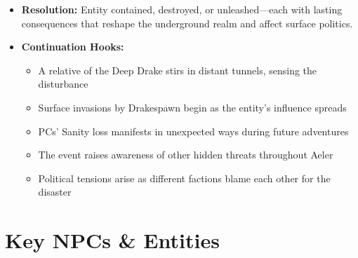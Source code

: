 \documentclass[11pt]{article}
\begin{document}
\begin{itemize}
\begin{itemize}
  \end{itemize}
\item \textbf{Resolution:} Entity contained, destroyed, or unleashed—each with lasting consequences that reshape the underground realm and affect surface politics.
\item \textbf{Continuation Hooks:}
  \begin{itemize}
  \item A relative of the Deep Drake stirs in distant tunnels, sensing the disturbance
  \item Surface invasions by Drakespawn begin as the entity's influence spreads
  \item PCs' Sanity loss manifests in unexpected ways during future adventures
  \item The event raises awareness of other hidden threats throughout Aeler
  \item Political tensions arise as different factions blame each other for the disaster
  \end{itemize}
\end{itemize}

\section{Key NPCs \& Entities}
\end{document}
